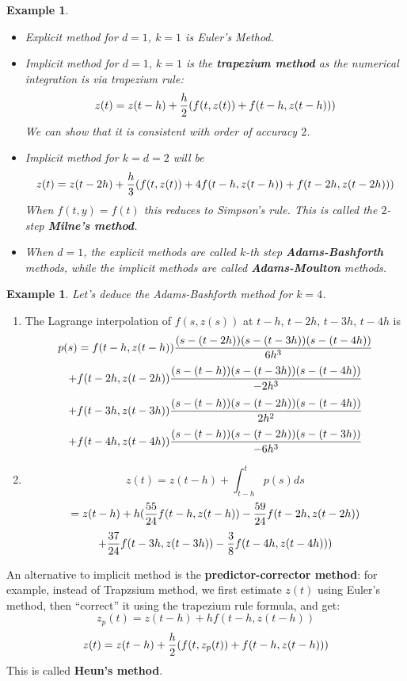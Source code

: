 \documentclass[20pt]{article} %
\theoremstyle{break}
\newtheorem{exa}[definition]{Example}
\begin{document}
\newpage

\begin{exa}\begin{itemize}
  \item Explicit method for $d=1$, $k=1$ is Euler's Method.
  \item Implicit method for $d=1$, $k=1$ is the {\bf trapezium method} as the numerical integration is via trapezium rule:
\[z(t)=z(t-h)+{h\over 2}(f(t, z(t))+f(t-h, z(t-h)))\] 
We can show that it is consistent with order of accuracy $2$.
\item Implicit method for $k=d=2$ will be
  \[z(t)=z(t-2h)+{h\over 3}(f(t, z(t))+4f(t-h, z(t-h))+f(t-2h, z(t-2h)))\]
  When $f(t, y)=f(t)$ this reduces to Simpson's rule. This is called the $2$-step {\bf Milne's method}.
\item When $d=1$, the explicit methods are called $k$-th step {\bf Adams-Bashforth} methods, while the implicit methods are called {\bf Adams-Moulton} methods. 
\end{itemize}
\end{exa}

\newpage

\begin{exa}Let's deduce the Adams-Bashforth method for $k=4$.\end{exa}

\begin{enumerate}
\item The Lagrange interpolation of $f(s, z(s))$ at $t-h$, $t-2h$, $t-3h$, $t-4h$ is
  \[p(s)=f(t-h, z(t-h)){(s-(t-2h))(s-(t-3h))(s-(t-4h))\over 6h^3}\]
  \[+f(t-2h, z(t-2h)){(s-(t-h))(s-(t-3h))(s-(t-4h))\over -2h^3}\]
  \[+f(t-3h, z(t-3h)){(s-(t-h))(s-(t-2h))(s-(t-4h))\over 2h^2}\]
  \[+f(t-4h, z(t-4h)){(s-(t-h))(s-(t-2h))(s-(t-3h))\over -6h^3}\]
\item
  \[z(t)=z(t-h)+\int_{t-h}^tp(s)ds\]
  \[=z(t-h)+h({55\over 24}f(t-h, z(t-h))-{59\over 24}f(t-2h, z(t-2h))\]
  \[+{37\over 24}f(t-3h, z(t-3h))-{3\over 8}f(t-4h, z(t-4h)))\]
\end{enumerate}


\newpage

An alternative to implicit method is the {\bf predictor-corrector method}: for example, instead of Trapzsium method, we first estimate $z(t)$ using Euler's method, then ``correct'' it using the trapezium rule formula, and get:
\[z_{p}(t)=z(t-h)+hf(t-h, z(t-h))\]
\[z(t)=z(t-h)+{h\over 2}(f(t, z_p(t))+f(t-h, z(t-h)))\] 
This is called {\bf Heun's method}.

\newpage
\end{document}

